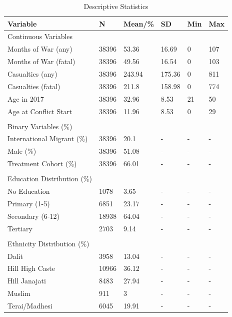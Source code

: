 \begin{table}[!h]
\centering
\caption{\label{tab:tab:descriptive}Descriptive Statistics}
\centering
\fontsize{10}{12}\selectfont
\begin{tabular}[t]{llllll}
\toprule
Variable & N & Mean/\% & SD & Min & Max\\
\midrule
Continuous Variables &  &  &  &  & \\
Months of War (any) & 38396 & 53.36 & 16.69 & 0 & 107\\
Months of War (fatal) & 38396 & 49.56 & 16.54 & 0 & 103\\
Casualties (any) & 38396 & 243.94 & 175.36 & 0 & 811\\
Casualties (fatal) & 38396 & 211.8 & 158.98 & 0 & 774\\
Age in 2017 & 38396 & 32.96 & 8.53 & 21 & 50\\
Age at Conflict Start & 38396 & 11.96 & 8.53 & 0 & 29\\
 &  &  &  &  & \\
Binary Variables (\%) &  &  &  &  & \\
International Migrant (\%) & 38396 & 20.1 & - & - & -\\
Male (\%) & 38396 & 51.08 & - & - & -\\
Treatment Cohort (\%) & 38396 & 66.01 & - & - & -\\
 &  &  &  &  & \\
Education Distribution (\%) &  &  &  &  & \\
No Education & 1078 & 3.65 & - & - & -\\

Primary (1-5) & 6851 & 23.17 & - & - & -\\
Secondary (6-12) & 18938 & 64.04 & - & - & -\\
Tertiary & 2703 & 9.14 & - & - & -\\
 &  &  &  &  & \\
Ethnicity Distribution (\%) &  &  &  &  & \\
\addlinespace
Dalit & 3958 & 13.04 & - & - & -\\
Hill High Caste & 10966 & 36.12 & - & - & -\\
Hill Janajati & 8483 & 27.94 & - & - & -\\
Muslim & 911 & 3 & - & - & -\\
Terai/Madhesi & 6045 & 19.91 & - & - & -\\
\bottomrule
\end{tabular}
\end{table}